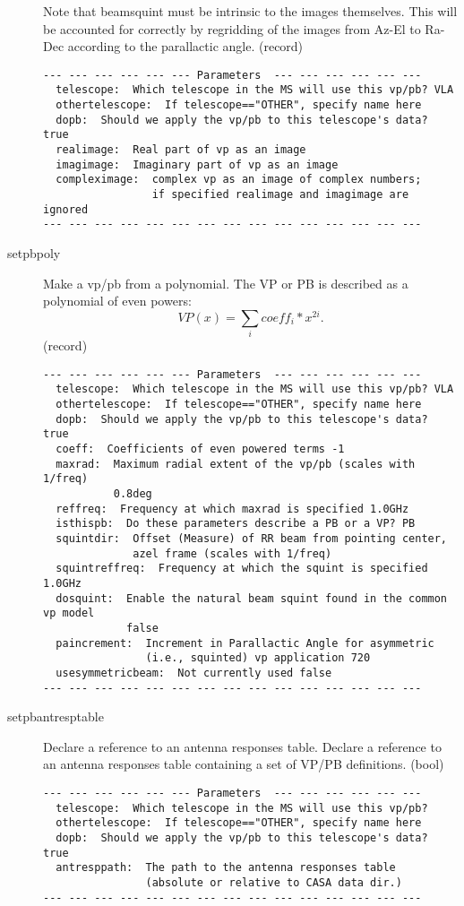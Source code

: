 \documentclass[12pt]{article}
\begin{document}
\begin{description}
   Note that beamsquint must be intrinsic to the images themselves.
   This will be accounted for correctly by regridding of the images
   from Az-El to Ra-Dec according to the parallactic angle.
   (record)
 
{\small
\begin{verbatim}
--- --- --- --- --- --- Parameters  --- --- --- --- --- ---
  telescope:  Which telescope in the MS will use this vp/pb? VLA 
  othertelescope:  If telescope=="OTHER", specify name here 
  dopb:  Should we apply the vp/pb to this telescope's data? true 
  realimage:  Real part of vp as an image 
  imagimage:  Imaginary part of vp as an image 
  compleximage:  complex vp as an image of complex numbers; 
                 if specified realimage and imagimage are ignored 
--- --- --- --- --- --- --- --- --- --- --- --- --- --- ---
\end{verbatim} 
} 


  \item[setpbpoly]
   Make a vp/pb from a polynomial.
   The VP or PB is described as a polynomial of even powers:
   \begin{equation}
     VP(x) = \sum_{i} coeff_{i} * x^{2i}.
   \end{equation}
   (record)

{\small
\begin{verbatim}
--- --- --- --- --- --- Parameters  --- --- --- --- --- ---
  telescope:  Which telescope in the MS will use this vp/pb? VLA 
  othertelescope:  If telescope=="OTHER", specify name here 
  dopb:  Should we apply the vp/pb to this telescope's data? true 
  coeff:  Coefficients of even powered terms -1 
  maxrad:  Maximum radial extent of the vp/pb (scales with 1/freq) 
           0.8deg 
  reffreq:  Frequency at which maxrad is specified 1.0GHz 
  isthispb:  Do these parameters describe a PB or a VP? PB 
  squintdir:  Offset (Measure) of RR beam from pointing center, 
              azel frame (scales with 1/freq) 
  squintreffreq:  Frequency at which the squint is specified 1.0GHz 
  dosquint:  Enable the natural beam squint found in the common vp model 
             false 
  paincrement:  Increment in Parallactic Angle for asymmetric 
                (i.e., squinted) vp application 720 
  usesymmetricbeam:  Not currently used false 
--- --- --- --- --- --- --- --- --- --- --- --- --- --- ---
\end{verbatim} 
} 


  \item[setpbantresptable]
   Declare a reference to an antenna responses table.
   Declare a reference to an antenna responses table containing a set of VP/PB definitions.
   (bool)
{\small
\begin{verbatim}
--- --- --- --- --- --- Parameters  --- --- --- --- --- ---
  telescope:  Which telescope in the MS will use this vp/pb? 
  othertelescope:  If telescope=="OTHER", specify name here 
  dopb:  Should we apply the vp/pb to this telescope's data? true 
  antresppath:  The path to the antenna responses table 
                (absolute or relative to CASA data dir.) 
--- --- --- --- --- --- --- --- --- --- --- --- --- --- ---
\end{verbatim} 
} 



\end{description}
\end{document}
